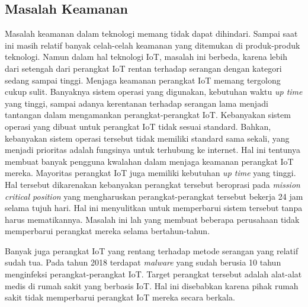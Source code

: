 \documentclass[12pt, letterpaper]{article}
\begin{document}
\subsection{Masalah Keamanan}
Masalah keamanan dalam teknologi memang tidak dapat dihindari. Sampai saat ini masih relatif banyak celah-celah keamanan yang ditemukan di produk-produk teknologi. Namun dalam hal teknologi IoT, masalah ini berbeda, karena lebih dari setengah dari perangkat IoT rentan terhadap serangan dengan kategori sedang sampai tinggi. \cite{threatpost20}
\newline
\indent
Menjaga keamanan perangkat IoT memang tergolong cukup sulit. Banyaknya sistem operasi yang digunakan, kebutuhan waktu \textit{up time} yang tinggi, sampai adanya kerentanan terhadap serangan lama menjadi tantangan dalam mengamankan perangkat-perangkat IoT. 
\newline
\indent
Kebanyakan sistem operasi yang dibuat untuk perangkat IoT tidak sesuai standard. Bahkan, kebanyakan sistem operasi tersebut tidak memiliki standard sama sekali, yang menjadi prioritas adalah fungsinya untuk terhubung ke internet. \cite{secledger17} Hal ini tentunya membuat banyak pengguna kwalahan dalam menjaga keamanan perangkat IoT mereka.
\newline
\indent
Mayoritas perangkat IoT juga memiliki kebutuhan \textit{up time} yang tinggi. Hal tersebut dikarenakan kebanyakan perangkat tersebut beroprasi pada \textit{mission critical position} yang mengharuskan perangkat-perangkat tersebut bekerja 24 jam selama tujuh hari. Hal ini menyulitkan untuk memperbarui sistem tersebut tanpa harus mematikannya. Masalah ini lah yang membuat beberapa perusahaan tidak memperbarui perangkat mereka selama bertahun-tahun.

Banyak juga perangkat IoT yang rentang terhadap metode serangan yang relatif sudah tua. Pada tahun 2018 terdapat \textit{malware} yang sudah berusia 10 tahun menginfeksi perangkat-perangkat IoT. \cite{futurum20} Target perangkat tersebut adalah alat-alat medis di rumah sakit yang berbasis IoT. Hal ini disebabkan karena pihak rumah sakit tidak memperbarui perangkat IoT mereka secara berkala.

\newpage
\printbibliography[title=Daftar Pustaka]
\end{document}
